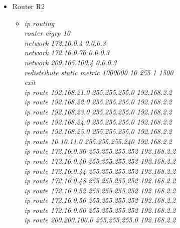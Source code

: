 \documentclass[a4paper, 12pt]{article}
\begin{document}
\begin{itemize}
\begin{itemize}
\begin{itemize}
          \end{itemize}
             \item Router R2
        \begin{itemize}
         \item \textit{ip routing\\
                        router eigrp 10\\
                        network 172.16.0.4 0.0.0.3\\
                        network 172.16.0.76 0.0.0.3\\
                        network 209.165.100.4 0.0.0.3\\
                        redistribute static metric 1000000 10 255 1 1500\\
                        exit\\
                        ip route 192.168.21.0 255.255.255.0 192.168.2.2\\
                        ip route 192.168.22.0 255.255.255.0 192.168.2.2\\
                        ip route 192.168.23.0 255.255.255.0 192.168.2.2\\
                        ip route 192.168.24.0 255.255.255.0 192.168.2.2\\
                        ip route 192.168.25.0 255.255.255.0 192.168.2.2\\
                        ip route 10.10.11.0 255.255.255.240 192.168.2.2\\
                        ip route 172.16.0.36 255.255.255.252 192.168.2.2\\
                        ip route 172.16.0.40 255.255.255.252 192.168.2.2\\
                        ip route 172.16.0.44 255.255.255.252 192.168.2.2\\
                        ip route 172.16.0.48 255.255.255.252 192.168.2.2\\
                        ip route 172.16.0.52 255.255.255.252 192.168.2.2\\
                        ip route 172.16.0.56 255.255.255.252 192.168.2.2\\
                        ip route 172.16.0.60 255.255.255.252 192.168.2.2\\
                        ip route 200.200.100.0 255.255.255.0 192.168.2.2\\}
         

\end{itemize}
\end{itemize}
\end{itemize}
\end{document}
